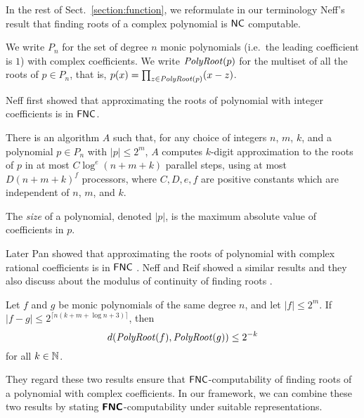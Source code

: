 \documentclass[envcountsame,orivec,oribibl]{llncs}
\begin{document}
In the rest of Sect.~\ref{section:function}, 
we reformulate in our terminology Neff's result that 
finding roots of a complex polynomial is $\mathsf{NC}$ computable. 

We write $P_n$ for the set of degree $n$ monic 
polynomials (i.e.\ the leading coefficient is $1$) with complex coefficients.
We write $\mathit{PolyRoot}(p)$ for the multiset of all the roots of $p \in P_n$, that is, $p(x) = \prod_{z \in \mathit{PolyRoot}(p)} (x - z)$. 

Neff first showed that approximating the roots of polynomial
with integer coefficients is in $\mathsf{FNC}$.
\begin{theorem}
\label{theorem:neff1994}
There is an algorithm $A$ such that,
for any choice of integers $n$, $m$, $k$, and a polynomial $p \in P_n$
with $|p| \le 2^m$,
$A$ computes $k$-digit approximation to the roots of $p$ 
in at most $C \log^e(n + m + k)$ parallel steps, 
using at most $D(n + m + k)^f$ processors, where $C, D, e, f$ are positive
constants which are independent of $n$, $m$, and $k$.
\end{theorem}
The \emph{size} of a polynomial, denoted $|p|$, is the maximum absolute value
 of coefficients in $p$.

Later Pan showed that approximating the roots of polynomial
with complex rational coefficients is in $\mathsf{FNC}$ \cite{pan1995optimal}.
Neff and Reif showed a similar results and they also discuss
about the modulus of continuity of finding roots \cite{neff1996efficient}.

\begin{theorem}
 Let $f$ and $g$ be monic polynomials of the same degree $n$,
 and let $|f| \le 2^m$.
 If $|f - g| \le 2^{\lceil n(k + m + \log n + 3)\rceil}$, then
 \begin{equation}
  d(\mathit{PolyRoot}(f), \mathit{PolyRoot}(g)) \le 2^{-k} 
 \end{equation}
 for all $k \in \mathbb N$.
\end{theorem}

They regard these two results ensure that $\mathsf{FNC}$-computability
of finding roots of a polynomial with complex coefficients.
In our framework, we can combine these two results by stating 
$\text{\bfseries \sffamily \upshape FNC}$-computability under suitable representations.
\end{document}
